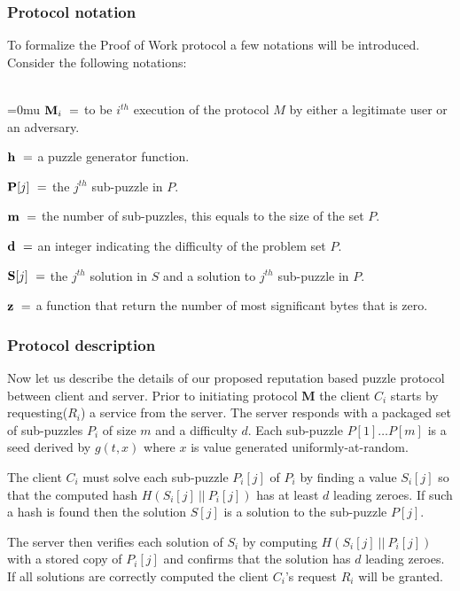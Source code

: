 \subsubsection{Protocol notation}\label{text:protonot}
To formalize the Proof of Work protocol a few notations will be introduced. Consider the following notations:
\\
\\
\indent \begin{minipage}{0.9\linewidth}
\thickmuskip=0mu
${\textbf M_i} \ = $ to be $i^{th}$ execution of the protocol $M$ by either a legitimate user or an adversary. 

${\textbf h} \ = $ a puzzle generator function.


${\textbf P[j]} \ = $ the $j^{th}$ sub-puzzle in $P$.

${\textbf m} \ = $ the number of sub-puzzles, this equals to the size of the set $P$. 

${\textbf d} \ = $ an integer indicating the difficulty of the problem set $P$. 

${\textbf S[j]} \ = $ the $j^{th}$ solution in $S$ and a solution to $j^{th}$ sub-puzzle in $P$. 

${\textbf z} \ = $ a function that return the number of most significant bytes that is zero. 
\end{minipage}

\subsubsection{Protocol description}\label{text:protodesc}
Now let us describe the details of our proposed reputation based puzzle protocol between client and server. Prior to initiating protocol \textbf{M} the client $C_i$ starts by requesting($R_i$) a service from the server. The server responds with a packaged set of sub-puzzles $P_i$ of size $m$ and a difficulty $d$. Each sub-puzzle $P[1] \dots P[m]$ is a seed derived by $g(t,x)$ where $x$ is value generated uniformly-at-random.

The client $C_i$ must solve each sub-puzzle $P_i[j]$ of $P_i$ by finding a value $S_i[j]$ so that the computed hash $H(S_i[j] \ || \ P_i[j] )$ has at least $d$ leading zeroes. If such a hash is found then the solution $S[j]$ is a solution to the sub-puzzle $P[j]$.

The server then verifies each solution of $S_i$ by computing $H(S_i[j] \ || \ P_i[j])$ with a stored copy of $P_i[j]$ and confirms that the solution has $d$ leading zeroes. If all solutions are correctly computed the client $C_i$'s request $R_i$ will be granted. 

